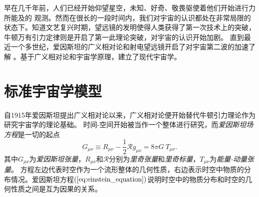 早在几千年前，人们已经开始仰望星空，未知、好奇、敬畏驱使着他们开始进行力所能及的
观测。然而在很长的一段时间内，我们对宇宙的认识都处在非常局限的状态下。知道文艺复兴时期，望远镜的发明使得人类获得了第一次技术上的突破，牛顿万有引力定律则是开启了第一此理论突破，对宇宙的认识开始加剧。
直到最近一个多世纪，爱因斯坦的广义相对论和射电望远镜开启了对宇宙第二波的加速了解
。基于广义相对论和宇宙学原理，建立了现代宇宙学。

\section{标准宇宙学模型}
自1915年爱因斯坦提出广义相对论以来，广义相对论便开始替代牛顿引力理论作为研究宇宙学的理论基础。
时间-空间开始被当作一个整体进行研究，而\textit{爱因斯坦场方程}是一切的起点
\begin{equation}
    \label{eq:einstein_equation}
    G_{\mu\nu}\equiv R_{\mu\nu}-\frac{1}{2}\mathcal{R}g_{\mu\nu}=8\pi G\ T_{\mu\nu}.
\end{equation}
其中$G_{\mu\nu}$为\textit{爱因斯坦张量}，$R_{\mu\nu}$和$\mathcal{R}$分别为\textit{里奇张量}和\textit{里奇标量}，$T_{\mu\nu}$为\textit{能量-动量张量}。
方程左边代表时空作为一个流形整体的几何性质，右边表示时空中物质的分布情况。爱因斯坦方程$(\ref{eq:einstein_equation})$说明时空中的物质分布和时空的几何性质之间是互为因果的关系。


